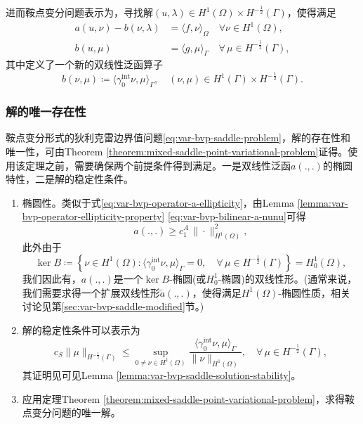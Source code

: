 进而鞍点变分问题表示为，寻找解$(u,\lambda) \in H^{1}(\Omega) \times H^{-\frac{1}{2}}(\Gamma)$，使得满足
\begin{equation}
  \label{eq:var-bvp-saddle-problem}
  \begin{split}
    a(u,\nu) - b(\nu,\lambda) &= \langle f,\nu \rangle_{\Omega} \quad \forall \nu \in H^{1}(\Omega),\\
    b(u,\mu) &= \langle g, \mu \rangle_{\Gamma} \quad \forall \, \mu \in H^{-\frac{1}{2}}(\Gamma),
  \end{split}
\end{equation}
其中定义了一个新的双线性泛函算子
\begin{equation*}
  b(\nu,\mu) \coloneqq \langle \gamma_{0}^{\text{int}} \nu, \mu \rangle_{\Gamma}, \quad (\nu,\mu) \in H^{1}(\Gamma) \times H^{-\frac{1}{2}}(\Gamma).
\end{equation*}

\subsubsection{解的唯一存在性}
\label{sec:var-bvp-saddle-solution-uniq}
鞍点变分形式的狄利克雷边界值问题\eqref{eq:var-bvp-saddle-problem}，解的存在性和唯一性，可由Theorem \ref{theorem:mixed-saddle-point-variational-problem}证得。使用该定理之前，需要确保两个前提条件得到满足。一是双线性泛函$a(.,.)$的椭圆特性，二是解的稳定性条件。
\begin{enumerate}
\item 椭圆性。类似于式\eqref{eq:var-bvp-operator-a-ellipticity}，由Lemma \ref{lemma:var-bvp-operator-ellipticity-property} \eqref{eq:var-bvp-bilinear-a-nunu}可得
\begin{equation*}
  a(.,.) \ge c_1^A \, \big\| \cdot \big\|_{H^{1}(\Omega)}^2,
\end{equation*}
此外由于
\begin{equation*}
  \ker B \coloneqq \left\{
  \nu \in H^{1}(\Omega) : \langle \gamma_{0}^{\text{int}} \nu, \mu \rangle_{\Gamma} = 0, \quad \forall \, \mu \in H^{-\frac{1}{2}}(\Gamma)
  \right\} = H_{0}^{1}(\Omega),
\end{equation*}
我们因此有，$a(.,.)$是一个$\ker B$-椭圆(或$H_{0}^{1}$-椭圆)的双线性形。(通常来说，我们需要求得一个扩展双线性形$\tilde{a}(.,.)$，使得满足$H^1(\Omega)$-椭圆性质，相关讨论见第\ref{sec:var-bvp-saddle-modified}节。)

\item 解的稳定性条件可以表示为
\begin{equation}
  \label{sec:var-bvp-saddle-solution-stability}
  c_S \big\| \mu \big\|_{H^{-\frac{1}{2}}(\Gamma)} \le
  \sup_{0 \neq \nu \in H^{1}(\Omega)} \frac{
  \langle \gamma_{0}^{\text{int}} \nu, \mu \rangle_{\Gamma}
  }{
  \big\| \nu \big\|_{H^{1}(\Omega)}
  }, \quad \forall \, \mu \in H^{-\frac{1}{2}}(\Gamma),
\end{equation}
其证明见可见Lemma \ref{lemma:var-bvp-saddle-solution-stability}。

\item 应用定理Theorem \ref{theorem:mixed-saddle-point-variational-problem}，求得鞍点变分问题的唯一解。
\end{enumerate}

